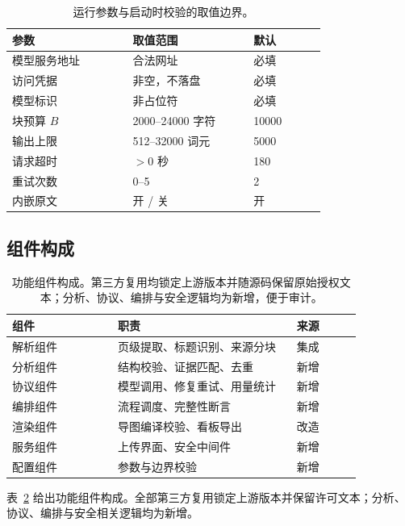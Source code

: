 \documentclass[11pt]{article}
\begin{document}
\begin{table}[t]
\centering
\small
\setlength{\tabcolsep}{3pt}
\begin{tabular}{@{}p{0.30\linewidth}p{0.30\linewidth}p{0.18\linewidth}@{}}
\toprule
\textbf{参数} & \textbf{取值范围} & \textbf{默认} \\
\midrule
模型服务地址 & 合法网址 & 必填 \\
访问凭据 & 非空，不落盘 & 必填 \\
模型标识 & 非占位符 & 必填 \\
块预算 $B$ & 2000--24000 字符 & 10000 \\
输出上限 & 512--32000 词元 & 5000 \\
请求超时 & $>0$ 秒 & 180 \\
重试次数 & 0--5 & 2 \\
内嵌原文 & 开 / 关 & 开 \\
\bottomrule
\end{tabular}
\caption{运行参数与启动时校验的取值边界。}
\label{tab:config}
\end{table}

\subsection{组件构成}\label{sec:modules}

\begin{table}[t]
\centering
\small
\setlength{\tabcolsep}{3pt}
\begin{tabular}{@{}p{0.26\linewidth}p{0.44\linewidth}p{0.16\linewidth}@{}}
\toprule
\textbf{组件} & \textbf{职责} & \textbf{来源} \\
\midrule
解析组件 & 页级提取、标题识别、来源分块 & 集成 \\
分析组件 & 结构校验、证据匹配、去重 & 新增 \\
协议组件 & 模型调用、修复重试、用量统计 & 新增 \\
编排组件 & 流程调度、完整性断言 & 新增 \\
渲染组件 & 导图编译校验、看板导出 & 改造 \\
服务组件 & 上传界面、安全中间件 & 新增 \\
配置组件 & 参数与边界校验 & 新增 \\
\bottomrule
\end{tabular}
\caption{功能组件构成。第三方复用均锁定上游版本并随源码保留原始授权文本；分析、协议、编排与安全逻辑均为新增，便于审计。}
\label{tab:modules}
\end{table}

表~\ref{tab:modules} 给出功能组件构成。全部第三方复用锁定上游版本并保留许可文本；分析、协议、编排与安全相关逻辑均为新增。
\end{document}
